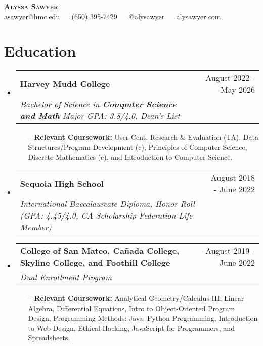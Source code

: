 \documentclass[letterpaper,10pt]{article}
\makeatletter
\newcommand{\resumeSubheading}[4]{
  \vspace{-2pt}\item
    \begin{tabular*}{0.97\textwidth}[t]{l@{\extracolsep{\fill}}r}
      \textbf{#1} & #2 \\
      \textit{\small#3} & \textit{\small #4} \\
    \end{tabular*}\vspace{-7pt}
}
\newcommand{\resumeSubHeadingListStart}{\begin{itemize}[leftmargin=0.15in, label={}]}
\newcommand{\resumeSubHeadingListEnd}{\end{itemize}}
\makeatother
\begin{document}
\begin{center}
    \textbf{\huge \scshape Alyssa Sawyer} \\ \vspace{3pt}
    \faEnvelope{} \href{asawyer@hmc.edu}{asawyer@hmc.edu} $\quad$ 
    \faPhone{} \href{tel:6503957429}{(650) 395-7429} $\quad$
    \faLinkedin{} \href{https://www.linkedin.com/in/alysawyer/}{@alysawyer} $\quad$
    \faGlobe{} \href{https://alysawyer.com}{alysawyer.com} $\quad$
\end{center}


\section{Education}
  \resumeSubHeadingListStart
    \resumeSubheading
      {Harvey Mudd College}{August 2022 - May 2026}
      {Bachelor of Science in \textbf{Computer Science and Math} Major GPA: 3.8/4.0, Dean's List}{}
        \begin{itemize}\small
        \setlength\itemsep{0em}
            \item[--] \textbf{Relevant Coursework:} User-Cent. Research & Evaluation (TA), Data Structures/Program Development (c), Principles of Computer Science,  Discrete Mathematics (c), and Introduction to Computer Science. 
        \end{itemize}
    \vspace{-5pt}
    \resumeSubheading
      {Sequoia High School}{August 2018 - June 2022}
      {International Baccalaureate Diploma, Honor Roll (GPA: 4.45/4.0, CA Scholarship Federation Life Member)}{} 
    \vspace{5pt}
    \resumeSubheading
      {College of San Mateo, Cañada College, Skyline College, and Foothill College}{August 2019 - June 2022}
      {Dual Enrollment Program}{}
        \begin{itemize}\small
        \setlength\itemsep{0em}
            \item[--] \textbf{Relevant Coursework:} Analytical Geometry/Calculus III, Linear Algebra, Differential Equations, Intro to Object-Oriented Program Design, Programming Methods: Java, Python Programming,
Introduction to Web Design, Ethical Hacking, JavaScript for Programmers, and Spreadsheets.
        \end{itemize}    
        
        
  \resumeSubHeadingListEnd
\end{document}
